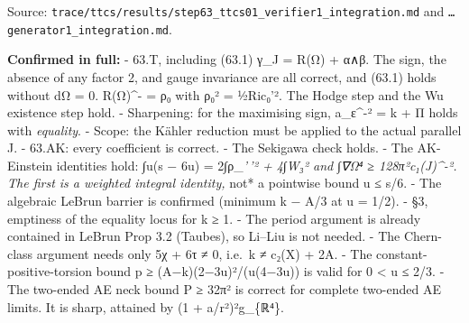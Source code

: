 \documentclass[
  10pt,
]{report}
\begin{document}
Source:
\texttt{trace/ttcs/results/step63\_ttcs01\_verifier1\_integration.md}
and \texttt{\ldots{}generator1\_integration.md}.

\textbf{Confirmed in full:} - 63.T, including (63.1) γ\_J = R(Ω) + α∧β.
The sign, the absence of any factor 2, and gauge invariance are all
correct, and (63.1) holds without dΩ = 0. R(Ω)\^{}- = ρ₀ with
\textbar ρ₀\textbar² = ½\textbar Ric₀'\textbar². The Hodge step and the
Wu existence step hold. - Sharpening: for the maximising sign,
\textbar a\_ε\^{}-\textbar² = k + Π holds with \emph{equality}. - Scope:
the Kähler reduction must be applied to the actual parallel J. - 63.AK:
every coefficient is correct. - The Sekigawa check holds. - The
AK-Einstein identities hold: ∫u(\textbar s\textbar{} − 6u) =
2∫\textbar ρ\_\emph{'\,'\textbar² + 4∫\textbar W₃\textbar² and
∫\textbar∇Ω\textbar⁴ ≥ 128π²\textbar c₁(J)\^{}-\textbar². The first is a
weighted integral identity, }not* a pointwise bound u ≤
\textbar s\textbar/6. - The algebraic LeBrun barrier is confirmed
(minimum k − A/3 at u = 1/2). - §3, emptiness of the equality locus for
k ≥ 1. - The period argument is already contained in LeBrun Prop 3.2
(Taubes), so Li--Liu is not needed. - The Chern-class argument needs
only 5χ + 6τ ≠ 0, i.e.~k ≠ c₂(X) + 2A. - The constant-positive-torsion
bound p ≥ (A−k)(2−3u)²/(u(4−3u)) is valid for 0 \textless{} u ≤ 2/3. -
The two-ended AE neck bound P ≥ 32π² is correct for complete two-ended
AE limits. It is sharp, attained by (1 + a/r²)²g\_\{ℝ⁴\}.
\end{document}
